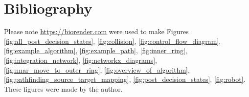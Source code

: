 \documentclass{article}
\begin{document}
\tableofcontents
\pagebreak


\pagebreak


\pagebreak


\pagebreak


\pagebreak


\pagebreak


\pagebreak


\section*{Bibliography}
Please note \href{https://biorender.com}{https://biorender.com} were used to make Figures \ref{fig:all_post_decision_states}, \ref{fig:collision}, \ref{fig:control_flow_diagram}, \ref{fig:example_algorithm}, \ref{fig:example_path}, \ref{fig:inner_ring}, \ref{fig:integration_network}, \ref{fig:networkx_diagrams}, \ref{fig:nnar_move_to_outer_ring}, \ref{fig:overview_of_algorithm}, \ref{fig:pathfinding_source_target_mapping}, \ref{fig:post_decision_states}, \ref{fig:robot}. These figures were made by the author.
 


\pagebreak

\end{document}
